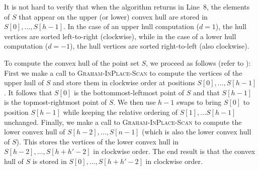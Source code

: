 \documentclass{elsart}
\begin{document}
It is not hard to verify that when the algorithm returns in Line~8,
the elements of $S$ that appear on the upper (or lower) convex hull
are stored in $S[0],\ldots,S[h-1]$.  In the case of an upper hull
computation ($d=1$), the hull vertices are sorted left-to-right
(clockwise), while in the case of a lower hull computation ($d=-1$),
the hull vertices are sorted right-to-left (also clockwise).

To compute the convex hull of the point set $S$, we proceed as follows
(refer to ): First we make a call to
\textsc{Graham-InPlace-Scan} to compute the vertices of the upper hull
of $S$ and store them in clockwise order at positions
$S[0],\ldots,S[h-1]$.  It follows that $S[0]$ is the
bottommost-leftmost point of $S$ and that $S[h-1]$ is the
topmost-rightmost point of $S$.  We then use $h-1$ swaps to bring
$S[0]$ to position $S[h-1]$ while keeping the relative ordering of
$S[1],\ldots S[h-1]$ unchanged.  Finally, we make a call to
\textsc{Graham-InPlace-Scan} to compute the lower convex hull of
$S[h-2],\ldots,S[n-1]$ (which is also the lower convex hull of $S$).
This stores the vertices of the lower convex hull in
$S[h-2],\ldots,S[h+h'-2]$ in clockwise order.  The end result is that
the convex hull of $S$ is stored in $S[0],\ldots,S[h+h'-2]$ in
clockwise order.

\newcommand{\fillit}{\raisebox{-.1cm}{\rule{0mm}{.45cm}}}
\end{document}
